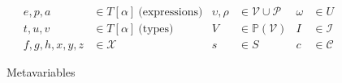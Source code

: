 \begin{figure}
\centering
\begin{align*}
e, p, a  &\in T[\alpha] \ \text{(expressions)} & \upsilon, \rho &\in \mathcal{V} \cup \mathcal{P} & \omega &\in U \\
t, u, v  &\in T[\alpha] \ \text{(types)} & V &\in \mathbb{P}(\mathcal{V}) & I &\in \mathcal{I}\\
f, g, h, x, y, z &\in \mathcal{X} & s &\in S & c &\in \mathcal{C}
\end{align*}
\caption{Metavariables}
\label{fig:metavariables}
\end{figure}